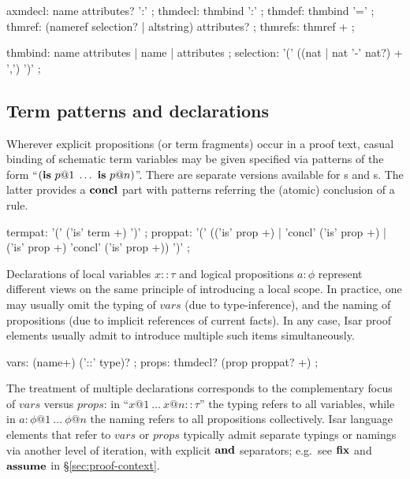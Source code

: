 \begin{rail}
  axmdecl: name attributes? ':'
  ;
  thmdecl: thmbind ':'
  ;
  thmdef: thmbind '='
  ;
  thmref: (nameref selection? | altstring) attributes?
  ;
  thmrefs: thmref +
  ;

  thmbind: name attributes | name | attributes
  ;
  selection: '(' ((nat | nat '-' nat?) + ',') ')'
  ;
\end{rail}


\subsection{Term patterns and declarations}\label{sec:term-decls}

Wherever explicit propositions (or term fragments) occur in a proof text,
casual binding of schematic term variables may be given specified via patterns
of the form ``$({\mathord{\mathbf{is}}}~p@1\;\dots~{\mathord{\mathbf{is}}}~p@n)$''.  There are separate versions
available for s and s.  The latter provides a
${\mathord{\mathbf{concl}}}$ part with patterns referring the (atomic) conclusion of a rule.

\begin{rail}
  termpat: '(' ('is' term +) ')'
  ;
  proppat: '(' (('is' prop +) | 'concl' ('is' prop +) | ('is' prop +) 'concl' ('is' prop +)) ')'
  ;
\end{rail}

Declarations of local variables $x :: \tau$ and logical propositions $a :
\phi$ represent different views on the same principle of introducing a local
scope.  In practice, one may usually omit the typing of $vars$ (due to
type-inference), and the naming of propositions (due to implicit references of
current facts).  In any case, Isar proof elements usually admit to introduce
multiple such items simultaneously.

\begin{rail}
  vars: (name+) ('::' type)?
  ;
  props: thmdecl? (prop proppat? +)
  ;
\end{rail}

The treatment of multiple declarations corresponds to the complementary focus
of $vars$ versus $props$: in ``$x@1~\dots~x@n :: \tau$'' the typing refers to
all variables, while in $a\colon \phi@1~\dots~\phi@n$ the naming refers to all
propositions collectively.  Isar language elements that refer to $vars$ or
$props$ typically admit separate typings or namings via another level of
iteration, with explicit ${\mathord{\mathbf{and}}}$ separators; e.g.\ see ${\mathord{\mathbf{fix}}}$ and
${\mathord{\mathbf{assume}}}$ in \S\ref{sec:proof-context}.


